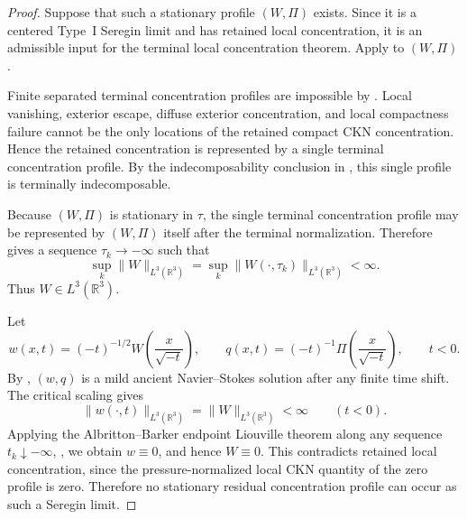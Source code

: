 \documentclass[11pt]{amsart}
\numberwithin{equation}{section}
\theoremstyle{plain}
\theoremstyle{definition}
\theoremstyle{remark}
\begin{document}
\begin{proof}
Suppose that such a stationary profile \((W,\Pi)\) exists.  Since it is a
centered Type~I Seregin limit and has retained local concentration, it is an admissible input
for the terminal local concentration theorem.  Apply  to
\((W,\Pi)\).

Finite separated terminal concentration profiles are impossible by
.  Local vanishing, exterior escape, diffuse
exterior concentration, and local compactness failure cannot be the only
locations of the retained compact CKN concentration.  Hence the retained
concentration is represented by a single terminal concentration profile.  By
the indecomposability conclusion in , this
single profile is terminally indecomposable.

Because \((W,\Pi)\) is stationary in \(\tau\), the single terminal
concentration profile may be represented by \((W,\Pi)\) itself after the
terminal normalization.  Therefore
 gives a sequence \(\tau_k\to-\infty\) such that
\begin{equation}\label{eq:R3S-W-L3-sequence}
   \sup_k\|W\|_{L^3(\mathbb R^3)}
   =
   \sup_k\|W(\cdot,\tau_k)\|_{L^3(\mathbb R^3)}
   <\infty .
\end{equation}
Thus \(W\in L^3(\mathbb R^3)\).

Let
\begin{equation}\label{eq:R3S-physical-pullback}
   w(x,t)=(-t)^{-1/2}W\!\left(\frac{x}{\sqrt{-t}}\right),
   \qquad
   q(x,t)=(-t)^{-1}\Pi\!\left(\frac{x}{\sqrt{-t}}\right),
   \qquad t<0 .
\end{equation}
By , \((w,q)\) is a mild ancient
Navier--Stokes solution after any finite time shift.  The critical scaling gives
\begin{equation}\label{eq:R3S-critical-L3-scaling}
   \|w(\cdot,t)\|_{L^3(\mathbb R^3)}=\|W\|_{L^3(\mathbb R^3)}<\infty
   \qquad (t<0).
\end{equation}
Applying the Albritton--Barker endpoint Liouville theorem along any sequence
\(t_k\downarrow-\infty\), , we obtain \(w\equiv0\), and hence
\(W\equiv0\).
This contradicts retained local concentration, since the pressure-normalized
local CKN quantity of the zero profile is zero.  Therefore no stationary
residual concentration profile can occur as such a Seregin limit.
\end{proof}
\end{document}
